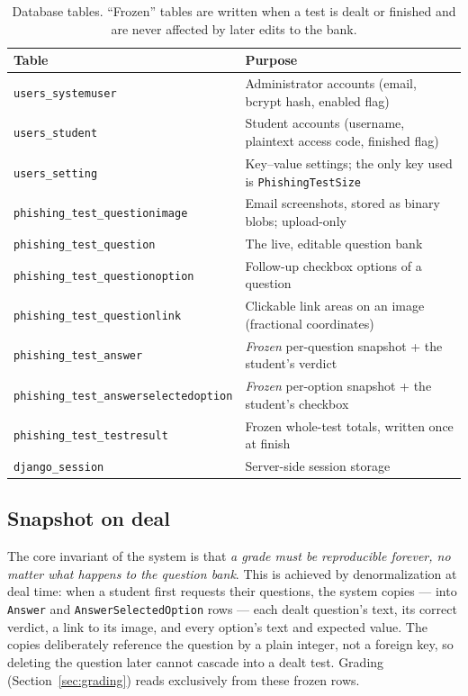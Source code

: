 \documentclass[11pt,a4paper]{article}
\newcommand{\code}[1]{\texttt{#1}}
\begin{document}
\begin{table}[h]
\centering
\small
\begin{tabular}{@{}ll@{}}
\toprule
\textbf{Table} & \textbf{Purpose} \\
\midrule
\code{users\_systemuser}    & Administrator accounts (email, bcrypt hash, enabled flag) \\
\code{users\_student}       & Student accounts (username, plaintext access code, finished flag) \\
\code{users\_setting}       & Key--value settings; the only key used is \code{PhishingTestSize} \\
\code{phishing\_test\_questionimage} & Email screenshots, stored as binary blobs; upload-only \\
\code{phishing\_test\_question}      & The live, editable question bank \\
\code{phishing\_test\_questionoption} & Follow-up checkbox options of a question \\
\code{phishing\_test\_questionlink}   & Clickable link areas on an image (fractional coordinates) \\
\code{phishing\_test\_answer}         & \emph{Frozen} per-question snapshot + the student's verdict \\
\code{phishing\_test\_answerselectedoption} & \emph{Frozen} per-option snapshot + the student's checkbox \\
\code{phishing\_test\_testresult}     & Frozen whole-test totals, written once at finish \\
\code{django\_session}      & Server-side session storage \\
\bottomrule
\end{tabular}
\caption{Database tables. ``Frozen'' tables are written when a test is
dealt or finished and are never affected by later edits to the bank.}
\label{tab:tables}
\end{table}

\subsection{Snapshot on deal}
\label{sec:snapshot}

The core invariant of the system is that \emph{a grade must be
reproducible forever, no matter what happens to the question bank}.
This is achieved by denormalization at deal time: when a student first
requests their questions, the system copies --- into
\code{Answer} and \code{AnswerSelectedOption} rows --- each dealt
question's text, its correct verdict, a link to its image, and every
option's text and expected value. The copies deliberately reference
the question by a plain integer, not a foreign key, so deleting the
question later cannot cascade into a dealt test. Grading
(Section~\ref{sec:grading}) reads exclusively from these frozen rows.
\end{document}
